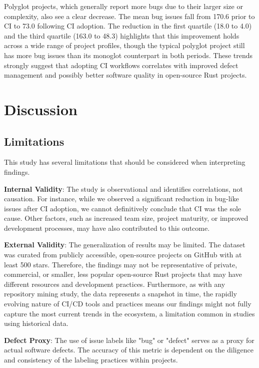 \documentclass[11pt]{article}
\begin{document}
Polyglot projects, which generally report more bugs due to their larger size or complexity, also see a clear decrease. The mean bug issues fall from 170.6 prior to CI to 73.0 following CI adoption. The reduction in the first quartile (18.0 to 4.0) and the third quartile (163.0 to 48.3) highlights that this improvement holds across a wide range of project profiles, though the typical polyglot project still has more bug issues than its monoglot counterpart in both periods. These trends strongly suggest that adopting CI workflows correlates with improved defect management and possibly better software quality in open-source Rust projects.

\section{Discussion}

\subsection{Limitations}
This study has several limitations that should be considered when interpreting findings.

\textbf{Internal Validity}: The study is observational and identifies correlations, not causation. For instance, while we observed a significant reduction in bug-like issues after CI adoption, we cannot definitively conclude that CI was the sole cause. Other factors, such as increased team size, project maturity, or improved development processes, may have also contributed to this outcome.

\textbf{External Validity}: The generalization of results may be limited. The dataset was curated from publicly accessible, open-source projects on GitHub with at least 500 stars. Therefore, the findings may not be representative of private, commercial, or smaller, less popular open-source Rust projects that may have different resources and development practices. Furthermore, as with any repository mining study, the data represents a snapshot in time, the rapidly evolving nature of CI/CD tools and practices means our findings might not fully capture the most current trends in the ecosystem, a limitation common in studies using historical data.

\textbf{Defect Proxy}: The use of issue labels like "bug" or "defect" serves as a proxy for actual software defects. The accuracy of this metric is dependent on the diligence and consistency of the labeling practices within projects.
\end{document}
